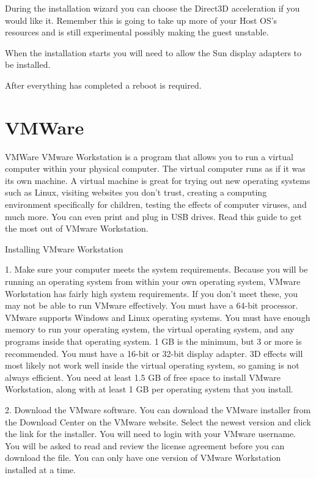 During the installation wizard you can choose the Direct3D acceleration if you would like it. Remember this is going to take up more of your Host OS’s resources and is still experimental possibly making the guest unstable.



When the installation starts you will need to allow the Sun display adapters to be installed.



After everything has completed a reboot is required.

\section{VMWare}

VMWare
VMware Workstation is a program that allows you to run a virtual computer within your physical computer. The virtual computer runs as if it was its own machine. A virtual machine is great for trying out new operating systems such as Linux, visiting websites you don't trust, creating a computing environment specifically for children, testing the effects of computer viruses, and much more. You can even print and plug in USB drives. Read this guide to get the most out of VMware Workstation.

Installing VMware Workstation


1. Make sure your computer meets the system requirements. Because you will be running an operating system from within your own operating system, VMware Workstation has fairly high system requirements. If you don’t meet these, you may not be able to run VMware effectively. You must have a 64-bit processor. VMware supports Windows and Linux operating systems. You must have enough memory to run your operating system, the virtual operating system, and any programs inside that operating system. 1 GB is the minimum, but 3 or more is recommended. You must have a 16-bit or 32-bit display adapter. 3D effects will most likely not work well inside the virtual operating system, so gaming is not always efficient. You need at least 1.5 GB of free space to install VMware Workstation, along with at least 1 GB per operating system that you install.



2. Download the VMware software. You can download the VMware installer from the Download Center on the VMware website. Select the newest version and click the link for the installer. You will need to login with your VMware username. You will be asked to read and review the license agreement before you can download the file. You can only have one version of VMware Workstation installed at a time.



